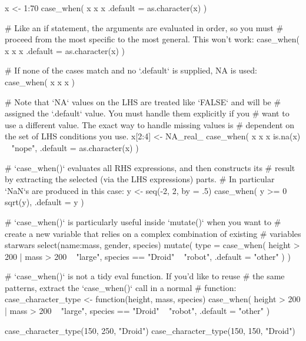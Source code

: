 \documentclass[a4paper]{book}
\begin{document}
%
\begin{SeeAlso}
\end{SeeAlso}
%
\begin{Examples}
\begin{ExampleCode}
x <- 1:70
case_when(
  x %
  x %
  x %
  .default = as.character(x)
)

# Like an if statement, the arguments are evaluated in order, so you must
# proceed from the most specific to the most general. This won't work:
case_when(
  x %
  x %
  x %
  .default = as.character(x)
)

# If none of the cases match and no `.default` is supplied, NA is used:
case_when(
  x %
  x %
  x %
)

# Note that `NA` values on the LHS are treated like `FALSE` and will be
# assigned the `.default` value. You must handle them explicitly if you
# want to use a different value. The exact way to handle missing values is
# dependent on the set of LHS conditions you use.
x[2:4] <- NA_real_
case_when(
  x %
  x %
  x %
  is.na(x) ~ "nope",
  .default = as.character(x)
)

# `case_when()` evaluates all RHS expressions, and then constructs its
# result by extracting the selected (via the LHS expressions) parts.
# In particular `NaN`s are produced in this case:
y <- seq(-2, 2, by = .5)
case_when(
  y >= 0 ~ sqrt(y),
  .default = y
)

# `case_when()` is particularly useful inside `mutate()` when you want to
# create a new variable that relies on a complex combination of existing
# variables
starwars %
  select(name:mass, gender, species) %
  mutate(
    type = case_when(
      height > 200 | mass > 200 ~ "large",
      species == "Droid" ~ "robot",
      .default = "other"
    )
  )


# `case_when()` is not a tidy eval function. If you'd like to reuse
# the same patterns, extract the `case_when()` call in a normal
# function:
case_character_type <- function(height, mass, species) {
  case_when(
    height > 200 | mass > 200 ~ "large",
    species == "Droid" ~ "robot",
    .default = "other"
  )
}

case_character_type(150, 250, "Droid")
case_character_type(150, 150, "Droid")


\end{ExampleCode}
\end{Examples}
\end{document}
